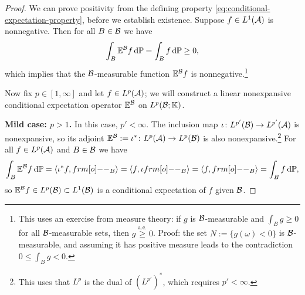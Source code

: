 \begin{proof}
  We can prove positivity from the defining property \eqref{eq:conditional-expectation-property}, before we establish existence.
  Suppose $f \in L^1(\mathcal{A})$ is nonnegative.
  Then for all $B \in \mathcal{B}$ we have
  \begin{equation*}
    \int_B \mathbb{E}^{\mathcal{B}} f \, \mathrm{d}\mathbb{P} = \int_B f \, \mathrm{d}\mathbb{P} \geq 0,
  \end{equation*}
  which implies that the $\mathcal{B}$-measurable function $\mathbb{E}^{\mathcal{B}}f$ is nonnegative.\footnote{This uses an exercise from measure theory: if $g$ is $\mathcal{B}$-measurable and $\int_B g \geq 0$ for all $\mathcal{B}$-measurable sets, then $g \stackrel{\mathrm{a.e.}}{\geq} 0$. Proof: the set $N := \{g(\omega) < 0\}$ is $\mathcal{B}$-measurable, and assuming it has positive measure leads to the contradiction $0 \leq \int_B g < 0$.}
  
  Now fix $p \in [1,\infty]$ and let $f \in L^p(\mathcal{A})$; we will construct a linear nonexpansive conditional expectation operator $\mathbb{E}^{\mathcal{B}}$ on $L^p(\mathcal{B};\mathbb{K})$.

  \textbf{Mild case: $p > 1$.}
  In this case, $p' < \infty$.
  The inclusion map $\iota \colon L^{p'}(\mathcal{B}) \rightarrow L^{p'}(\mathcal{A})$ is nonexpansive, so its adjoint $\mathbb{E}^{\mathcal{B}} := \iota^* \colon L^p(\mathcal{A}) \rightarrow L^p(\mathcal{B})$ is also nonexpansive.\footnote{This uses that $L^p$ is the dual of $(L^{p'})^*$, which requires $p' < \infty$.}
  For all $f \in L^p(\mathcal{A})$ and $B \in \mathcal{B}$ we have
  \begin{equation*}
    \int_B \E^{\mc{B}} f \, \dd\P = \langle \iota^* f, \1_{B} \rangle = \langle f, \iota \1_{B} \rangle = \langle f, \1_{B} \rangle = \int_B f \, \dd\P,
  \end{equation*}
  so $\mathbb{E}^{\mathcal{B}} f \in L^p(\mathcal{B}) \subset L^1(\mathcal{B})$ is a conditional expectation of $f$ given $\mathcal{B}$.



\end{proof}
